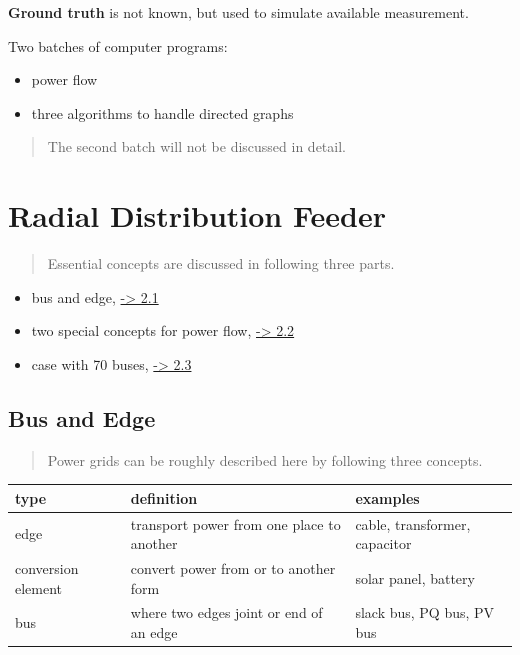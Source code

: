 \documentclass[
]{book}
\providecommand{\tightlist}{%
  \setlength{\itemsep}{0pt}\setlength{\parskip}{0pt}}
\begin{document}
\textbf{Ground truth} is not known, but used to simulate available measurement.

Two batches of computer programs:

\begin{itemize}
\tightlist
\item
  power flow
\item
  three algorithms to handle directed graphs
\end{itemize}

\begin{quote}
The second batch will not be discussed in detail.
\end{quote}

\hypertarget{radial-distribution-feeder}{%
\chapter{Radial Distribution Feeder}\label{radial-distribution-feeder}}

\begin{quote}
Essential concepts are discussed in following three parts.
\end{quote}

\begin{itemize}
\tightlist
\item
  bus and edge, \protect\hyperlink{bus-edge}{-\textgreater{} 2.1}
\item
  two special concepts for power flow, \protect\hyperlink{concepts}{-\textgreater{} 2.2}
\item
  case with 70 buses, \protect\hyperlink{case}{-\textgreater{} 2.3}
\end{itemize}

\hypertarget{bus-edge}{%
\section{Bus and Edge}\label{bus-edge}}

\begin{quote}
Power grids can be roughly described here by following three concepts.
\end{quote}

\begin{table}[H]
\centering
\begin{tabular}[t]{l|l|l}
\hline
type & definition & examples\\
\hline
edge & transport power from one place to another & cable, transformer, capacitor\\
\hline
conversion element & convert power from or to another form & solar panel, battery\\
\hline
bus & where two edges joint or end of an edge & slack bus, PQ bus, PV bus\\
\hline
\end{tabular}
\end{table}
\end{document}
